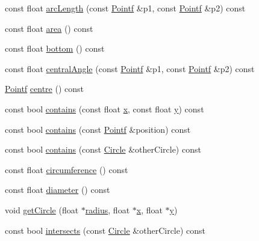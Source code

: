 \begin{DoxyCompactItemize}
\item 
const float \hyperlink{classprism_1_1_circle_a8784d12fcb2c2a2ca679635afba4c15e}{arc\+Length} (const \hyperlink{classprism_1_1_pointf}{Pointf} \&p1, const \hyperlink{classprism_1_1_pointf}{Pointf} \&p2) const 
\item 
const float \hyperlink{classprism_1_1_circle_a2fd1893972ad8b267bebfdc59efafb84}{area} () const 
\item 
const float \hyperlink{classprism_1_1_circle_a88c4958371f4e07082c3b28527b67d4b}{bottom} () const 
\item 
const float \hyperlink{classprism_1_1_circle_aee1d224313e23f96ae2fcff7abeaf336}{central\+Angle} (const \hyperlink{classprism_1_1_pointf}{Pointf} \&p1, const \hyperlink{classprism_1_1_pointf}{Pointf} \&p2) const 
\item 
\hyperlink{classprism_1_1_pointf}{Pointf} \hyperlink{classprism_1_1_circle_acecd853a1b505fc0c847b7172974d669}{centre} () const 
\item 
const bool \hyperlink{classprism_1_1_circle_aafcedb559b7bbba00cfd84fab7378801}{contains} (const float \hyperlink{classprism_1_1_circle_ae1f729f8fa34605123628e67b230b6be}{x}, const float \hyperlink{classprism_1_1_circle_a6edc045d912b0d278bd0673af028290e}{y}) const 
\item 
const bool \hyperlink{classprism_1_1_circle_a040d5d38d68e652ae948459f60352db8}{contains} (const \hyperlink{classprism_1_1_pointf}{Pointf} \&position) const 
\item 
const bool \hyperlink{classprism_1_1_circle_a652c895f7e3822a5bb2109ec4763deeb}{contains} (const \hyperlink{classprism_1_1_circle}{Circle} \&other\+Circle) const 
\item 
const float \hyperlink{classprism_1_1_circle_ad32df9ed83620dd55e9541af31258899}{circumference} () const 
\item 
const float \hyperlink{classprism_1_1_circle_a9157a21edb3cf02e2eae06d97fe7dec4}{diameter} () const 
\item 
void \hyperlink{classprism_1_1_circle_a84de2ca47dc084e49cc6645e7e723b9d}{get\+Circle} (float $\ast$\hyperlink{classprism_1_1_circle_a75afa2c59f92909d6b6edcec338030fb}{radius}, float $\ast$\hyperlink{classprism_1_1_circle_ae1f729f8fa34605123628e67b230b6be}{x}, float $\ast$\hyperlink{classprism_1_1_circle_a6edc045d912b0d278bd0673af028290e}{y})
\item 
const bool \hyperlink{classprism_1_1_circle_a2c9d9c17e0e094eac55f74398986b940}{intersects} (const \hyperlink{classprism_1_1_circle}{Circle} \&other\+Circle) const 

\end{DoxyCompactItemize}
